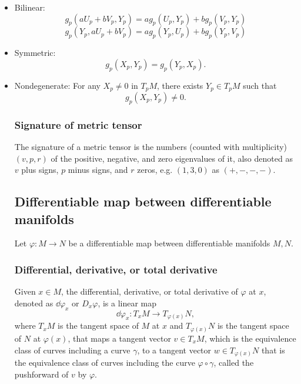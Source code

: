 \documentclass[a4paper,12pt]{report}
\begin{document}
\begin{itemize}
\begin{itemize}
\subsubsection{Direction space}
The direction space of an affine subspace is the tangent space of it at any point on it. Note that the tangent spaces of an affine subspace at any two points on it are the same.
\subsubsection{Metric tensor}
Let $M$ be a smooth manifold of dimension $n$. A metric tensor or tensor $g_p$ at a point $p$ is a function $g_p\colon (T_pM)^2\to\bbR$ that is
\bit
\item Bilinear:
\[g_p(aU_p+bV_p,Y_p)=ag_p(U_p,Y_p)+bg_p(V_p,Y_p)\]
\[g_p(Y_p,aU_p+bV_p)=ag_p(Y_p,U_p)+bg_p(Y_p,V_p)\]
\item Symmetric:
\[g_p(X_p,Y_p)=g_p(Y_p,X_p).\]
\item Nondegenerate: For any $X_p\ne0$ in $T_pM$, there exists $Y_p\in T_pM$ such that
\[g_p(X_p,Y_p)\ne0.\]
\eit
\subsubsection{Signature of metric tensor}
The signature of a metric tensor is the numbers (counted with multiplicity) $(v,p,r)$ of the positive, negative, and zero eigenvalues of it, also denoted as $v$ plus signs, $p$ minus signs, and $r$ zeros, e.g. $(1,3,0)$ as $(+,-,-,-)$.
\subsection{Differentiable map between differentiable manifolds}
Let $\varphi\colon M\to N$ be a differentiable map between differentiable manifolds $M,N$.
\subsubsection{Differential, derivative, or total derivative}
Given $x\in M$, the differential, derivative, or total derivative of $\varphi$ at $x$, denoted as $\dd{\varphi_x}$ or $D_x\varphi$, is a linear map
\[\dd{\varphi_x}\colon T_xM\to T_{\varphi(x)}N,\]
where $T_xM$ is the tangent space of $M$ at $x$ and $T_{\varphi(x)}N$ is the tangent space of $N$ at $\varphi(x)$, that maps a tangent vector $v\in T_xM$, which is the equivalence class of curves including a curve $\gamma$, to a tangent vector $w\in T_{\varphi(x)}N$ that is the equivalence class of curves including the curve $\varphi\circ\gamma$, called the pushforward of $v$ by $\varphi$.

\end{itemize}
\end{itemize}
\end{document}

